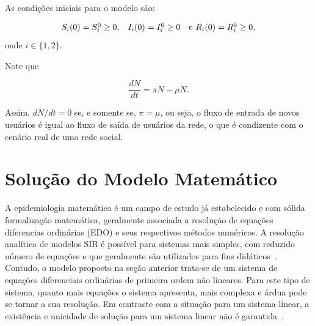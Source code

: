 \documentclass[
	12pt,				%
	openright,			%
	oneside,			%
	a4paper,			%
	english,			%
	french,				%
	spanish,			%
	brazil				%
	]{abntex2}
\newcommand{\grifar}[1]{\textcolor{Red}{\textbf{#1}}}
\begin{document}

As condições iniciais para o modelo são:

\begin{equation}
  \begin{array}{ccc}
    S_i(0) = S_i^0 \geq 0, & I_i(0) = I_i^0 \geq 0 & $e$\ R_i(0) = R_i^0 \geq 0,
  \end{array} \nonumber
\end{equation}
\noindent onde $i \in \{1, 2\}$.

Note que

\begin{equation}
  \frac{dN}{dt} = \pi N - \mu N. \nonumber
\end{equation}

Assim, $dN/dt = 0$ se, e somente se, $\pi = \mu$, ou seja, o fluxo de
entrada de novos usuários é igual ao fluxo de saída de usuários da
rede, o que é condizente com o cenário real de uma rede social.


\chapter{Solução do Modelo Matemático}
A epidemiologia matemática é um campo de estudo já estabelecido e com
sólida formalização matemática, geralmente associada a resolução de
equações diferencias ordinárias (EDO) e seus respectivos métodos
numéricos.  A resolução analítica de modelos SIR é possível para
sistemas mais simples, com reduzido número de equações e que
geralmente são utilizados para fins
didáticos~\cite{santos2012}. Contudo, o modelo proposto na seção
anterior trata-se de um sistema de equações diferenciais ordinárias de
primeira ordem não lineares.  Para este tipo de sistema, quanto mais
equações o sistema apresenta, mais complexa e árdua pode se tornar a
sua resolução. Em contraste com a situação para um sistema linear, a
existência e unicidade de solução para um sistema linear não é
garantida~\cite{boyce2003,zill2003}.
\end{document}
